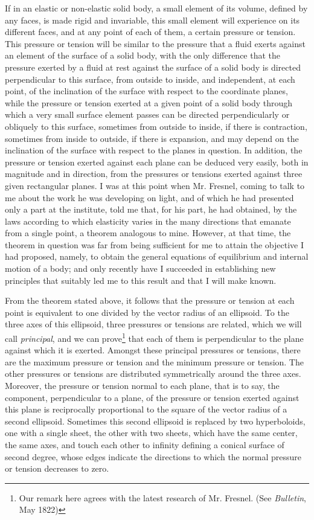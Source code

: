 \documentclass[openright,smallroyalvopaper,8pt,twoside,showtrims]{memoir}
\begin{document}
If in an elastic or non-elastic solid body, a small element of its volume, defined by any faces, is made rigid and invariable, this small element will experience on its different faces, and at any point of each of them, a certain pressure or tension. This pressure or tension will be similar to the pressure that a fluid exerts against an element of the surface of a solid body, with the only difference that the pressure exerted by a fluid at rest against the surface of a solid body is directed perpendicular to this surface, from outside to inside, and independent, at each point, of the inclination of the surface with respect to the coordinate planes, while the pressure or tension exerted at a given point of a solid body through which a very small surface element passes can be directed perpendicularly or obliquely to this surface, sometimes from outside to inside, if there is contraction, sometimes from inside to outside, if there is expansion, and may depend on the inclination of the surface with respect to the planes in question. In addition, the pressure or tension exerted against each plane can be deduced very easily, both in magnitude and in direction, from the pressures or tensions exerted against three given rectangular planes. I was at this point when Mr. Fresnel, coming to talk to me about the work he was developing on light, and of which he had presented only a part at the institute, told me that, for his part, he had obtained, by the laws according to which elasticity varies in the many directions that emanate from a single point, a theorem analogous to mine. However, at that time, the theorem in question was far from being sufficient for me to attain the objective I had proposed, namely, to obtain the general equations of equilibrium and internal motion of a body; and only recently have I  succeeded in establishing new principles that suitably led me to this result and that I will make known. 


From the theorem stated above, it follows that the pressure or tension at each point is equivalent to one divided by the vector radius of an ellipsoid. To the three axes of this ellipsoid, three pressures or tensions are related, which we will call \emph{principal}, and we can prove\footnote{Our remark here agrees with the latest research of Mr. Fresnel. (See \emph{Bulletin}, May 1822)} that each of them is perpendicular to the plane against which it is exerted. Amongst these principal pressures or tensions, there are the maximum pressure or tension and the minimum pressure or tension. The other pressures or tensions are distributed symmetrically around the three axes. Moreover, the pressure or tension normal to each plane, that is to say, the component, perpendicular to a plane, of the pressure or tension exerted against this plane is reciprocally proportional to the square of the vector radius of a second ellipsoid. Sometimes this second ellipsoid is replaced by two hyperboloids, one with a single sheet, the other with two sheets, which have the same center, the same axes, and touch each other to infinity defining a conical surface of second degree, whose edges indicate the directions to which the normal pressure or tension decreases to zero. 
\end{document}
